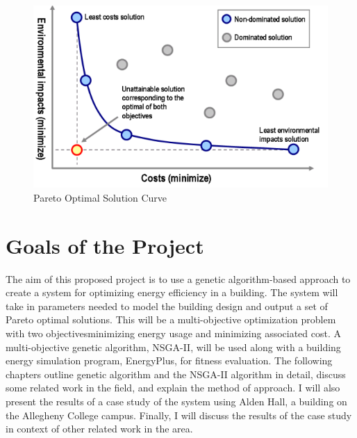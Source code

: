 \begin{figure}[htbp]
\centering
\includegraphics[width = 0.5\linewidth]{images/pareto.png}
\caption{Pareto Optimal Solution Curve \cite{Coley2002}}
\label{fig:pareto}
\end{figure}

\section{Goals of the Project}\label{sec:goals}

The aim of this proposed project is to use a genetic algorithm-based approach 
to create a system for optimizing energy efficiency in a building. The system 
will take in parameters needed to model the building design and output a set of Pareto optimal solutions. This will be a multi-objective optimization problem with two objectives\textemdash minimizing energy usage and minimizing associated cost. A multi-objective genetic algorithm, NSGA-II, will be used along with a building energy simulation program, EnergyPlus, for fitness evaluation. The following chapters outline genetic algorithm and the NSGA-II algorithm in detail, discuss some related work in the field, and explain the method of approach. I will also present the results of a case study of the system using Alden Hall, a building on the Allegheny College campus. Finally, I will discuss the results of the case study in context of other related work in the area.




